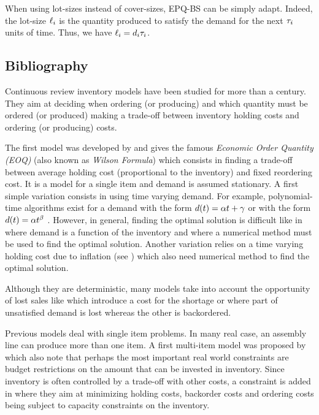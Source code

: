 \medskip


When using lot-sizes instead of cover-sizes, EPQ-BS can be simply adapt.
Indeed, the lot-size $\ell_i$ is the quantity produced to satisfy the demand for the next $\tau_i$ units of time.
Thus, we have $\ell_i=d_i\tau_i$.


\subsection{Bibliography}


Continuous review inventory models have been studied for more than a century.
They aim at deciding when ordering (or producing) and which quantity must be ordered (or produced) making a trade-off between inventory holding costs and ordering (or producing) costs.


The first model was developed by \cite{Harris1913} and gives the famous \emph{Economic Order Quantity (EOQ)} (also known as \emph{Wilson Formula}) which consists in finding a trade-off between average holding cost (proportional to the inventory) and fixed reordering cost.
It is a model for a single item and demand is assumed stationary.
A first simple variation consists in using time varying demand.
For example, polynomial-time algorithms exist for a demand with the form $d(t)=\alpha t+\gamma$ \cite{Resh1976,Donaldson1977} or with the form $d(t)=\alpha t^{\beta}$ \cite{Barbosa1978}.
However, in general, finding the optimal solution is difficult like in \cite{Padmanabhan1990} where demand is a function of the inventory and  where a numerical method must be used to find the optimal solution.
Another  variation relies on a time varying holding cost due to inflation (see \cite{Vrat1990}) which also need numerical method to find the optimal solution.


Although they are deterministic, many models take into account the opportunity of lost sales like \cite{Salameh2003} which introduce a cost for the shortage or \cite{Park1982} where part of unsatisfied demand is lost whereas the other is backordered.


\medskip


Previous models deal with single item problems.
In many real case, an assembly line can produce more than one item.
A first multi-item model was proposed by \cite{Hadley1963} which also note that perhaps the most important real world constraints are budget restrictions on the amount that can be invested in inventory.
Since inventory is often controlled by a trade-off with other costs, a constraint is added in \cite{Ohno2001} where they aim at minimizing holding costs, backorder costs and ordering costs being subject to capacity constraints on the inventory.


